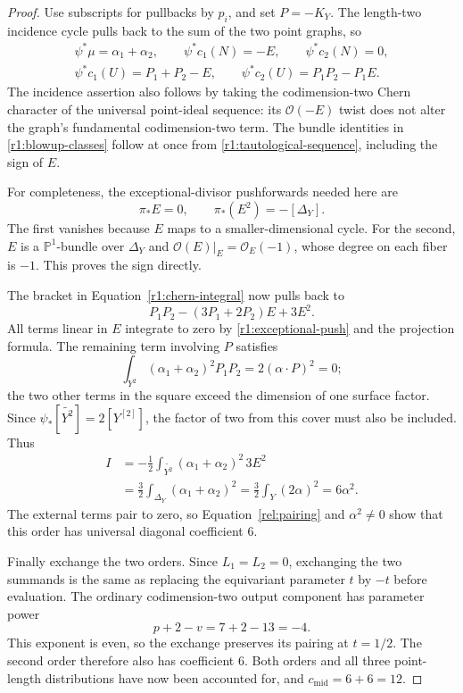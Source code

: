 \begin{proof}
Use subscripts for pullbacks by $p_i$, and set $P=-K_Y$.  The
length-two incidence cycle pulls back to the sum of the two point
graphs, so
\begin{equation}\label{r1:blowup-classes}
 \begin{gathered}
 \psi^*\mu=\alpha_1+\alpha_2,\qquad
 \psi^*c_1(N)=-E,\qquad \psi^*c_2(N)=0,\\
 \psi^*c_1(U)=P_1+P_2-E,\qquad
 \psi^*c_2(U)=P_1P_2-P_1E.
 \end{gathered}
\end{equation}
The incidence assertion also follows by taking the codimension-two
Chern character of the universal point-ideal sequence: its
$\mathcal O(-E)$ twist does not alter the graph's fundamental
codimension-two term.  The bundle identities in
\eqref{r1:blowup-classes} follow at once from
\eqref{r1:tautological-sequence}, including the sign of $E$.

For completeness, the exceptional-divisor pushforwards needed here are
\begin{equation}\label{r1:exceptional-push}
 \pi_*E=0,\qquad \pi_*(E^2)=-[\Delta_Y].
\end{equation}
The first vanishes because $E$ maps to a smaller-dimensional cycle.
For the second, $E$ is a $\mathbb P^1$-bundle over $\Delta_Y$ and
$\mathcal O(E)|_E=\mathcal O_E(-1)$, whose degree on each fiber is
$-1$.  This proves the sign directly.

The bracket in Equation~\eqref{r1:chern-integral} now pulls back to
\[
 P_1P_2-(3P_1+2P_2)E+3E^2.
\]
All terms linear in $E$ integrate to zero by
\eqref{r1:exceptional-push} and the projection formula.  The remaining
term involving $P$ satisfies
\[
 \int_{Y^2}(\alpha_1+\alpha_2)^2P_1P_2
       =2(\alpha\cdot P)^2=0;
\]
the two other terms in the square exceed the dimension of one
surface factor.  Since $\psi_*[\widetilde{Y^2}]=2[Y^{[2]}]$, the
factor of two from this cover must also be included.  Thus
\begin{align*}
 I
 &=-\frac12\int_{\widetilde{Y^2}}
                  (\alpha_1+\alpha_2)^2\,3E^2\\
 &=\frac32\int_{\Delta_Y}(\alpha_1+\alpha_2)^2
   =\frac32\int_Y(2\alpha)^2
   =6\alpha^2.
\end{align*}
The external terms pair to zero, so Equation~\eqref{rel:pairing}
and $\alpha^2\neq0$ show that this order has universal diagonal
coefficient $6$.

Finally exchange the two orders.  Since $L_1=L_2=0$, exchanging
the two summands is the same as replacing the equivariant parameter
$t$ by $-t$ before evaluation.  The ordinary codimension-two output
component has parameter power
\[
 p+2-v=7+2-13=-4.
\]
This exponent is even, so the exchange preserves its pairing at
$t=1/2$.  The second order therefore also has coefficient $6$.
Both orders and all three point-length distributions have now been
accounted for, and $c_{\mathrm{mid}}=6+6=12$.
\end{proof}

